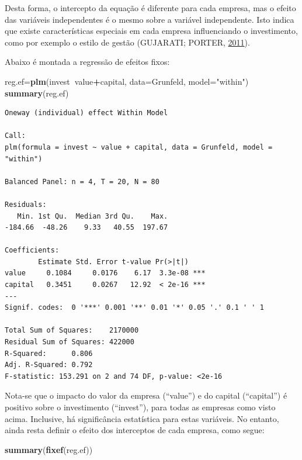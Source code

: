 \documentclass[12pt,brazil,oneside]{book}
\newenvironment{Shaded}{\begin{snugshade}}{\end{snugshade}}
\newcommand{\DataTypeTok}[1]{\textcolor[rgb]{0.13,0.29,0.53}{#1}}
\newcommand{\KeywordTok}[1]{\textcolor[rgb]{0.13,0.29,0.53}{\textbf{#1}}}
\newcommand{\NormalTok}[1]{#1}
\newcommand{\OperatorTok}[1]{\textcolor[rgb]{0.81,0.36,0.00}{\textbf{#1}}}
\newcommand{\StringTok}[1]{\textcolor[rgb]{0.31,0.60,0.02}{#1}}
\begin{document}
Desta forma, o intercepto da equação é diferente para cada empresa, mas o efeito das variáveis independentes é o mesmo sobre a variável independente. Isto indica que existe características especiais em cada empresa influenciando o investimento, como por exemplo o estilo de gestão (GUJARATI; PORTER, \protect\hyperlink{ref-Gujarati2011}{2011}).

Abaixo é montada a regressão de efeitos fixos:

\begin{Shaded}
\begin{Highlighting}[]
\NormalTok{reg.ef=}\KeywordTok{plm}\NormalTok{(invest}\OperatorTok{~}\NormalTok{value}\OperatorTok{+}\NormalTok{capital, }
           \DataTypeTok{data=}\NormalTok{Grunfeld, }\DataTypeTok{model=}\StringTok{"within"}\NormalTok{)}
\KeywordTok{summary}\NormalTok{(reg.ef)}
\end{Highlighting}
\end{Shaded}

\begin{verbatim}
Oneway (individual) effect Within Model

Call:
plm(formula = invest ~ value + capital, data = Grunfeld, model = "within")

Balanced Panel: n = 4, T = 20, N = 80

Residuals:
   Min. 1st Qu.  Median 3rd Qu.    Max. 
-184.66  -48.26    9.33   40.55  197.67 

Coefficients:
        Estimate Std. Error t-value Pr(>|t|)    
value     0.1084     0.0176    6.17  3.3e-08 ***
capital   0.3451     0.0267   12.92  < 2e-16 ***
---
Signif. codes:  0 '***' 0.001 '**' 0.01 '*' 0.05 '.' 0.1 ' ' 1

Total Sum of Squares:    2170000
Residual Sum of Squares: 422000
R-Squared:      0.806
Adj. R-Squared: 0.792
F-statistic: 153.291 on 2 and 74 DF, p-value: <2e-16
\end{verbatim}

Nota-se que o impacto do valor da empresa (``value'') e do capital (``capital'') é positivo sobre o investimento (``invest''), para todas as empresas como visto acima. Inclusive, há significância estatística
para estas variáveis. No entanto, ainda resta definir o efeito dos interceptos de cada empresa, como segue:

\begin{Shaded}
\begin{Highlighting}[]
\KeywordTok{summary}\NormalTok{(}\KeywordTok{fixef}\NormalTok{(reg.ef))}
\end{Highlighting}
\end{Shaded}
\end{document}
